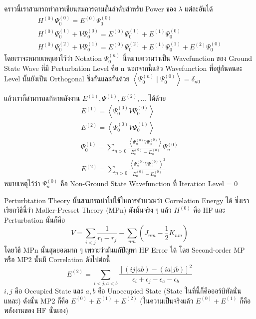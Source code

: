 คราวนี้เราสามารถทำการเขียนสมการตามขั้นลำดับสำหรับ Power ของ $\lambda$ แต่ละอันได้
%
\begin{gather}
    H^{(0)} \Psi_0^{(0)} = E^{(0)} \Psi_0^{(0)} \\
    H^{(0)} \Psi_0^{(1)}+V \Psi_0^{(0)}
    = E^{(0)} \Psi_0^{(1)}+E^{(1)} \Psi_0^{(0)} \\
    H^{(0)} \Psi_0^{(2)}+V \Psi_0^{(1)}
    = E^{(0)} \Psi_0^{(2)}+E^{(1)} \Psi_0^{(1)}+E^{(2)} \Psi_0^{(0)}
\end{gather}
%
โดยเราจะหมายเหตุเอาไว้ว่า Notation $\Psi_0^{(n)}$ นี้หมายความว่าเป็น Wavefunction ของ Ground State Wave ที่มี Perturbation Level คือ $\mathrm{n}$ นอกจากนี้แล้ว Wavefunction ที่อยู่กันคนละ Level นั้นยังเป็น Orthogonal ซึ่งกันและกันด้วย $\left\langle\Psi_0^{(n)} \mid \Psi_0^{(0)}\right\rangle = \delta_{n 0}$

แล้วเราก็สามารถแก้หาพลังงาน $E^{(1)}, \Psi^{(1)}, E^{(2)}, \dots$ ได้ด้วย
%
\begin{gather}
    E^{(1)} = \left\langle\Psi_0^{(0)} V \Psi_0^{(0)}\right\rangle \\
    E^{(2)} = \left\langle\Psi_0^{(0)} V \Psi_0^{(1)}\right\rangle \\
    \Psi_0^{(1)} = \sum_{n>0} \frac{\left\langle\Psi_n^{(0)} V \Psi_0^{(0)}\right\rangle}
    {E_0^{(0)}-E_n^{(0)}} \Psi_n^{(0)} \\
    E^{(2)} = \sum_{n>0} \frac{\left\langle\Psi_n^{(0)} V \Psi_0^{(0)}\right\rangle^2}
    {E_0^{(0)}-E_n^{(0)}}
\end{gather}
%
หมายเหตุไว้ว่า $\Psi^{(0)}_{n}$ คือ Non-Ground State Wavefunction ที่ Iteration Level = 0

Perturbtation Theory นั้นสามารถนำไปใช้ในการคำนวณว่า Correlation Energy ได้ ซึ่งเราเรียกวิธีนี้ว่า M{\o}ller-Presset Theory (MPn) ดังนั้นจริง ๆ แล้ว $H^{(0)}$ คือ HF และ Perturbation นั้นก็คือ
%
\begin{equation}
    V = \sum_{i < j} \frac{1}{r_{i} - r_{j}} - \sum_{nm} (J_{nm} - \frac{1}{2}K_{nm})
\end{equation}
%
โดยวิธี MPn นั้นสุดยอดมาก ๆ เพราะว่ามันแก้ปัญหา HF Error ได้ โดย Second-order MP หรือ MP2 นั้นมี Correlation ดังไปต่อนี้
%
\begin{equation}
    E^{(2)} = \sum_{i<j,a<b} \frac{[(ij|ab) - (ia|jb)]^{2}}
    {\epsilon_{i} + \epsilon_{j} - \epsilon_{a} - \epsilon_{b}}
\end{equation}
%
\noindent $i,j$ คือ Occupied State และ $a,b$ คือ Unoccupied State (State ในที่นี้ก็คือออร์บิทัลนั่นแหละ) ดังนั้น MP2 ก็คือ $E^{(0)} + E^{(1)} + E^{(2)}$ (ในความเป็นจริงแล้ว $E^{(0)} + E^{(1)}$ ก็คือพลังงานของ HF นั่นเอง)

